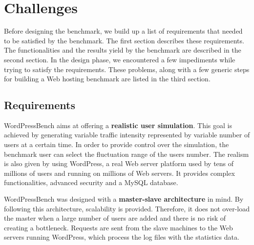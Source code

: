 \chapter{Challenges}
\label{chapter:chapter3}

Before designing the benchmark, we build up a list of requirements that needed to be satisfied by the benchmark. The first section describes these requirements. The functionalities and the results yield by the benchmark are described in the second section. In the design phase, we encountered a few impediments while trying to satisfy the requirements. These problems, along with a few generic steps for building a Web hosting benchmark are listed in the third section.


\section{Requirements}
\label{sec:projectdescription}

WordPressBench aims at offering a \textbf{realistic user simulation}. This goal is achieved by generating variable traffic intensity represented by variable number of users at a certain time. In order to provide control over the simulation, the benchmark user can select the fluctuation range of the users number. The realism is also given by using WordPress, a real Web server platform used by tens of millions of users and running on millions of Web servers. It provides complex functionalities, advanced security and a MySQL database.

WordPressBench was designed with a \textbf{master-slave architecture} in mind. By following this architecture, scalability is provided. Therefore, 
it does not over-load the master when a large number of users are added and there is no risk of creating a bottleneck. Requests are sent from the slave machines to the Web servers running WordPress, which process the log files with the statistics data.

